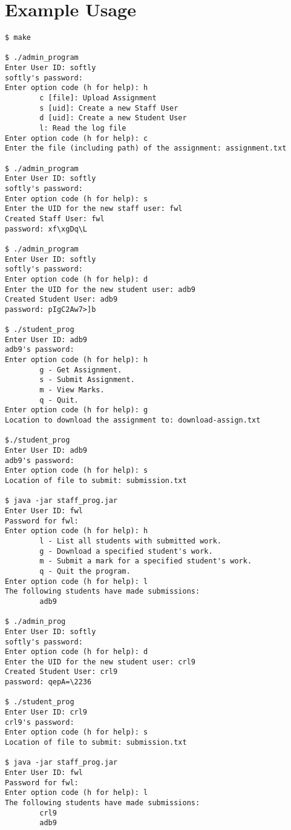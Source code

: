 \section{Example Usage}

\begin{verbatim}
$ make

$ ./admin_program
Enter User ID: softly
softly's password:
Enter option code (h for help): h
        c [file]: Upload Assignment
        s [uid]: Create a new Staff User
        d [uid]: Create a new Student User
        l: Read the log file
Enter option code (h for help): c
Enter the file (including path) of the assignment: assignment.txt

$ ./admin_program
Enter User ID: softly
softly's password:
Enter option code (h for help): s
Enter the UID for the new staff user: fwl
Created Staff User: fwl
password: xf\xgDq\L

$ ./admin_program
Enter User ID: softly
softly's password:
Enter option code (h for help): d
Enter the UID for the new student user: adb9
Created Student User: adb9
password: pIgC2Aw7>]b

$ ./student_prog
Enter User ID: adb9
adb9's password:
Enter option code (h for help): h
        g - Get Assignment.
        s - Submit Assignment.
        m - View Marks.
        q - Quit.
Enter option code (h for help): g
Location to download the assignment to: download-assign.txt

$./student_prog
Enter User ID: adb9
adb9's password:
Enter option code (h for help): s
Location of file to submit: submission.txt

$ java -jar staff_prog.jar
Enter User ID: fwl
Password for fwl:
Enter option code (h for help): h
        l - List all students with submitted work.
        g - Download a specified student's work.
        m - Submit a mark for a specified student's work.
        q - Quit the program.
Enter option code (h for help): l
The following students have made submissions:
        adb9

$ ./admin_prog
Enter User ID: softly
softly's password:
Enter option code (h for help): d
Enter the UID for the new student user: crl9
Created Student User: crl9
password: qepA=\2236

$ ./student_prog
Enter User ID: crl9
crl9's password:
Enter option code (h for help): s
Location of file to submit: submission.txt

$ java -jar staff_prog.jar
Enter User ID: fwl
Password for fwl:
Enter option code (h for help): l
The following students have made submissions:
        crl9
        adb9


\end{verbatim}
